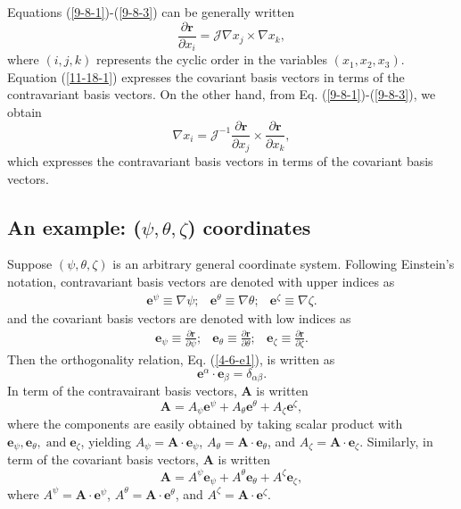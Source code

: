 \documentclass{llncs}
\newcommand{\tmop}[1]{\ensuremath{\operatorname{#1}}}
\begin{document}
Equations (\ref{9-8-1})-(\ref{9-8-3}) can be generally written
\begin{equation}
  \label{11-18-1} \frac{\partial \mathbf{r}}{\partial x_i} =\mathcal{J} \nabla
  x_j \times \nabla x_k,
\end{equation}
where $(i, j, k)$ represents the cyclic order in the variables $(x_1, x_2,
x_3)$. Equation (\ref{11-18-1}) expresses the covariant basis vectors in terms
of the contravariant basis vectors. On the other hand, from Eq.
(\ref{9-8-1})-(\ref{9-8-3}), we obtain
\begin{equation}
  \label{20-10-15-a1} \nabla x_i =\mathcal{J}^{- 1} \frac{\partial
  \mathbf{r}}{\partial x_j} \times \frac{\partial \mathbf{r}}{\partial x_k},
\end{equation}
which expresses the contravariant basis vectors in terms of the covariant
basis vectors.

\subsection{An example: ($\psi, \theta, \zeta$) coordinates}

Suppose $(\psi, \theta, \zeta)$ is an arbitrary general coordinate system.
Following Einstein's notation, contravariant basis vectors are denoted with
upper indices as
\begin{eqnarray}
  \mathbf{e}^{\psi} \equiv \nabla \psi ; & \mathbf{e}^{\theta} \equiv \nabla
  \theta ; & \mathbf{e}^{\zeta} \equiv \nabla \zeta . 
\end{eqnarray}
and the covariant basis vectors are denoted with low indices as
\begin{eqnarray}
  \mathbf{e}_{\psi} \equiv \frac{\partial \mathbf{r}}{\partial \psi} ; &
  \mathbf{e}_{\theta} \equiv \frac{\partial \mathbf{r}}{\partial \theta} ; &
  \mathbf{e}_{\zeta} \equiv \frac{\partial \mathbf{r}}{\partial \zeta} . 
\end{eqnarray}
Then the orthogonality relation, Eq. (\ref{4-6-e1}), is written as
\begin{equation}
  \mathbf{e}^{\alpha} \cdot \mathbf{e}_{\beta} = \delta_{\alpha \beta} .
\end{equation}
In term of the contravairant basis vectors, $\mathbf{A}$ is written
\begin{equation}
  \label{9-8-8} \mathbf{A}= A_{\psi} \mathbf{e}^{\psi} + A_{\theta}
  \mathbf{e}^{\theta} + A_{\zeta} \mathbf{e}^{\zeta},
\end{equation}
where the components are easily obtained by taking scalar product with
$\mathbf{e}_{\psi}, \mathbf{e}_{\theta}, \tmop{and} \mathbf{e}_{\zeta}$,
yielding $A_{\psi} =\mathbf{A} \cdot \mathbf{e}_{\psi}$, $A_{\theta}
=\mathbf{A} \cdot \mathbf{e}_{\theta}$, and $A_{\zeta} =\mathbf{A} \cdot
\mathbf{e}_{\zeta}$. Similarly, in term of the covariant basis vectors,
$\mathbf{A}$ is written
\begin{equation}
  \label{9-8-7} \mathbf{A}= A^{\psi} \mathbf{e}_{\psi} + A^{\theta}
  \mathbf{e}_{\theta} + A^{\zeta} \mathbf{e}_{\zeta},
\end{equation}
where $A^{\psi} =\mathbf{A} \cdot \mathbf{e}^{\psi}$, $A^{\theta} =\mathbf{A}
\cdot \mathbf{e}^{\theta}$, and $A^{\zeta} =\mathbf{A} \cdot
\mathbf{e}^{\zeta}$.
\end{document}
